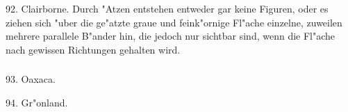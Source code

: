 \documentclass[a4paper, 11pt, oneside, polutonikogreek, german]{article}
\begin{document}
92. Clairborne. Durch "Atzen entstehen entweder gar keine Figuren, oder es ziehen sich "uber die ge"atzte graue und feink"ornige Fl"ache einzelne, zuweilen mehrere parallele B"ander hin, die jedoch nur sichtbar sind, wenn die Fl"ache nach gewissen Richtungen gehalten wird.

\subsubsection{}
\hspace*{6mm}93. Oaxaca.

94. Gr"onland.
\clearpage
\end{document}
